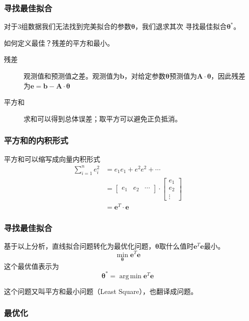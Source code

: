 \documentclass[14pt]{beamer}
\newcommand{\mat}[1]{\bm{#1}}
\renewcommand{\vec}[1]{\bm{#1}}
\DeclareMathOperator*{\argmin}{arg\,min}
\let\emph\relax %
\begin{document}
    \begin{frame}
        \frametitle{寻找最佳拟合}
        对于3组数据我们无法找到完美拟合的参数$\vec{\theta}$，我们退求其次
        寻找最佳拟合$\vec{\theta}^*$。
        
        如何定义最佳？残差的平方和最小。
        \begin{description}
            \item[残差] 观测值和预测值之差。观测值为$\vec{b}$，对给定参数$\vec{\theta}$预测值为$\mat{A}\cdot\vec{\theta}$，因此残差为$\vec{e}=\vec{b}-\mat{A}\cdot\vec{\theta}$ 
            \item[平方和] 求和可以得到总体误差；取平方可以避免正负抵消。 
        \end{description}
    \end{frame}
    \begin{frame}
        \frametitle{平方和的内积形式}
        平方和可以缩写成向量内积形式
        \begin{align*}
            \sum_{i=1}^n e_i^2&= e_1e_1+e^2e^2+\cdots\\
                    &=\begin{bmatrix}
                        e_1 & e_2 & \cdots
                    \end{bmatrix}\cdot
                    \begin{bmatrix}
                        e_1\\
                        e_2\\
                        \vdots
                    \end{bmatrix}\\
                    &=\vec{e}^T\cdot\vec{e}
        \end{align*}
    \end{frame}

    \begin{frame}
        \frametitle{寻找最佳拟合}
        基于以上分析，直线拟合问题转化为最优化问题，$\vec{\theta}$取什么值时$\vec{e}^T\vec{e}$最小。
        \[ \min_{\vec{\theta}} \vec{e}^T\vec{e}\]
        这个最优值表示为
        \[\vec{\theta}^*=\argmin \vec{e}^T\vec{e} \]

        这个问题又叫平方和最小问题（Least Square），也翻译成\emph{最小二乘}问题。
    \end{frame}
    
    \begin{frame}
        \frametitle{最优化}
    
        
    
    \end{frame}
\end{document}
